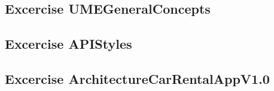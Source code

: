 \subsection{Excercise UMEGeneralConcepts}
\label{sec:ume_general_concepts}


\subsection{Excercise APIStyles}
\label{sec:api_styles}


\subsection{Excercise ArchitectureCarRentalAppV1.0}
\label{sec:architecture_car_rental_app_v1_0}